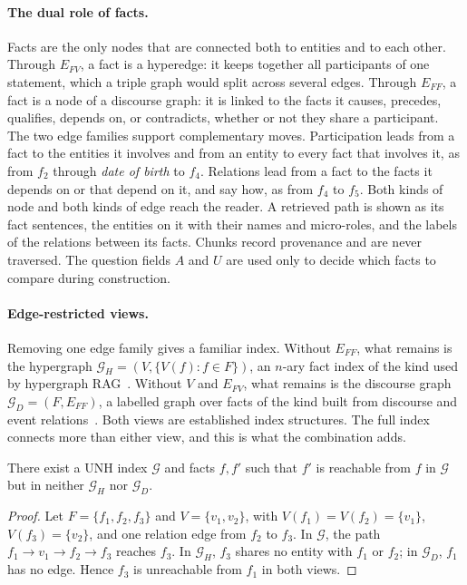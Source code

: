 \documentclass[sigconf, review, anonymous]{acmart}
\newcommand{\sys}{UNH}
\newcommand{\Efv}{E_{FV}}
\newcommand{\Eff}{E_{FF}}
\begin{document}
\paragraph{\textbf{The dual role of facts.}}
Facts are the only nodes that are connected both to entities and to each other. Through $\Efv$, a fact is a hyperedge: it keeps together all participants of one statement, which a triple graph would split across several edges. Through $\Eff$, a fact is a node of a discourse graph: it is linked to the facts it causes, precedes, qualifies, depends on, or contradicts, whether or not they share a participant. The two edge families support complementary moves. Participation leads from a fact to the entities it involves and from an entity to every fact that involves it, as from $f_2$ through \emph{date of birth} to $f_4$. Relations lead from a fact to the facts it depends on or that depend on it, and say how, as from $f_4$ to $f_5$. Both kinds of node and both kinds of edge reach the reader. A retrieved path is shown as its fact sentences, the entities on it with their names and micro-roles, and the labels of the relations between its facts. Chunks record provenance and are never traversed. The question fields $A$ and $U$ are used only to decide which facts to compare during construction.

\paragraph{\textbf{Edge-restricted views.}}
Removing one edge family gives a familiar index. Without $\Eff$, what remains is the hypergraph $\mathcal{G}_H = (V, \{V(f) : f \in F\})$, an $n$-ary fact index of the kind used by hypergraph RAG~\cite{luo2025hypergraphrag}. Without $V$ and $\Efv$, what remains is the discourse graph $\mathcal{G}_D = (F, \Eff)$, a labelled graph over facts of the kind built from discourse and event relations~\cite{prasad2017penn,zhang2020aser,yang2025eventrag}. Both views are established index structures. The full index connects more than either view, and this is what the combination adds.

\begin{proposition}
\label{prop:views}
There exist a \sys{} index $\mathcal{G}$ and facts $f, f'$ such that $f'$ is reachable from $f$ in $\mathcal{G}$ but in neither $\mathcal{G}_H$ nor $\mathcal{G}_D$.
\end{proposition}

\begin{proof}
Let $F = \{f_1, f_2, f_3\}$ and $V = \{v_1, v_2\}$, with $V(f_1) = V(f_2) = \{v_1\}$, $V(f_3) = \{v_2\}$, and one relation edge from $f_2$ to $f_3$. In $\mathcal{G}$, the path $f_1 \to v_1 \to f_2 \to f_3$ reaches $f_3$. In $\mathcal{G}_H$, $f_3$ shares no entity with $f_1$ or $f_2$; in $\mathcal{G}_D$, $f_1$ has no edge. Hence $f_3$ is unreachable from $f_1$ in both views.
\end{proof}
\end{document}
